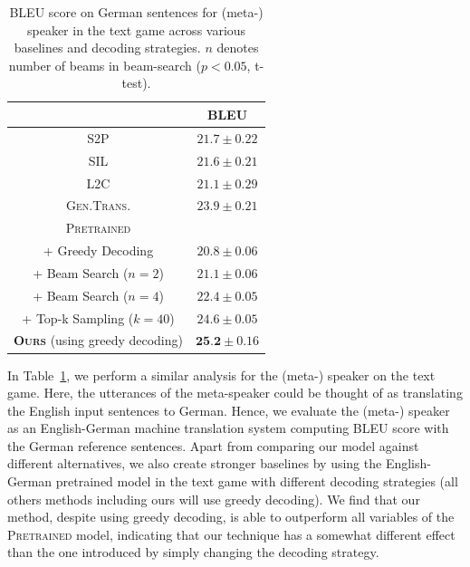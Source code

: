 \documentclass{article}
\newcommand{\ltc}{\textsc{L2C\xspace}}
\newcommand{\stp}{\textsc{S2P\xspace}}
\newcommand{\gentrans}{\textsc{Gen.Trans.\xspace}}
\newcommand{\sil}{\textsc{SIL\xspace}}
\begin{document}
\begin{table}
  \centering
  \small
  \begin{tabular}{|c|c|}
  \toprule
       &  BLEU \\
       \midrule
       \stp & $21.7 \pm 0.22$ \\
       \hline
       \sil & $21.6 \pm 0.21$ \\
       \hline
       \ltc & $21.1 \pm 0.29$ \\
       \hline
       \gentrans & $23.9 \pm 0.21$ \\
       \hline
       \hline
       \multicolumn{1}{c}{\textsc{Pretrained}} & \\
        + Greedy Decoding & $20.8 \pm 0.06$ \\
        \hline
        + Beam Search ($n=2$) & $21.1 \pm 0.06$ \\
        \hline
        + Beam Search ($n=4$) & $22.4 \pm 0.05$ \\
        \hline
        + Top-k Sampling ($k=40$) & $24.6 \pm 0.05$ \\
        \midrule
        \textbf{\textsc{Ours}} (using greedy decoding) & $\textbf{25.2} \pm 0.16$ \\
        \bottomrule
  \end{tabular}
  \caption{BLEU score on German sentences for (meta-) speaker in the text game across various baselines and decoding strategies. $n$ denotes number of beams in beam-search ($p < 0.05$, t-test).}
  \label{tab:meta-spk-trans-text}
\end{table}

In Table~\ref{tab:meta-spk-trans-text}, we perform a similar analysis for the (meta-) speaker on the text game. Here, the utterances of the meta-speaker could be thought of as translating the English input sentences to German. Hence, we evaluate the (meta-) speaker as an English-German machine translation system computing BLEU score with the German reference sentences. Apart from comparing our model against different alternatives, we also create stronger baselines by using the English-German pretrained model in the text game with different decoding strategies (all others methods including ours will use greedy decoding). We find that our method, despite using greedy decoding, is able to outperform all variables of the \textsc{Pretrained} model, indicating that our technique has a somewhat different effect than the one introduced by simply changing the decoding strategy. 
\end{document}
